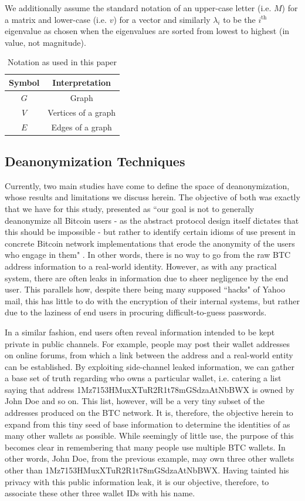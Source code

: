 \documentclass[journal]{IEEEtran}
\begin{document}
We additionally assume the standard notation of an upper-case letter (i.e. $M$) for a matrix and lower-case (i.e. $v$) for a vector and similarly $\lambda_{i}$ to be the $i^{\text{th}}$ eigenvalue as chosen when the eigenvalues are sorted from lowest to highest (in value, not magnitude).

\begin{table}[]
\centering
\caption{Notation as used in this paper}
\label{tab:notation}
\begin{tabular}{cc}
\textbf{Symbol} & \textbf{Interpretation} \\ \hline
$G$ & Graph \\
$V$ & Vertices of a graph \\
$E$ & Edges of a graph \\
\end{tabular}
\end{table}

\subsection{Deanonymization Techniques}
Currently, two main studies have come to define the space of deanonymization, whose results and limitations we discuss herein. The objective of both was exactly that we have for this study, presented as ``our goal is not to generally deanonymize all Bitcoin users - as the abstract protocol design itself dictates that this should be impossible - but rather to identify certain idioms of use present in concrete Bitcoin network implementations that erode the anonymity of the users who engage in them" \cite{fistful}. In other words, there is no way to go from the raw BTC address information to a real-world identity. However, as with any practical system, there are often leaks in information due to sheer negligence by the end user. This parallels how, despite there being many supposed ``hacks" of Yahoo mail, this has little to do with the encryption of their internal systems, but rather due to the laziness of end users in procuring difficult-to-guess passwords.

In a similar fashion, end users often reveal information intended to be kept private in public channels. For example, people may post their wallet addresses on online forums, from which a link between the address and a real-world entity can be established. By exploiting side-channel leaked information, we can gather a base set of truth regarding who owns a particular wallet, i.e. catering a list saying that address 1Mz7153HMuxXTuR2R1t78mGSdzaAtNbBWX is owned by John Doe and so on. This list, however, will be a very tiny subset of the addresses produced on the BTC network. It is, therefore, the objective herein to expand from this tiny seed of base information to determine the identities of as many other wallets as possible. While seemingly of little use, the purpose of this becomes clear in remembering that many people use multiple BTC wallets. In other words, John Doe, from the previous example, may own three other wallets other than 1Mz7153HMuxXTuR2R1t78mGSdzaAtNbBWX. Having tainted his privacy with this public information leak, it is our objective, therefore, to associate these other three wallet IDs with his name.
\end{document}
